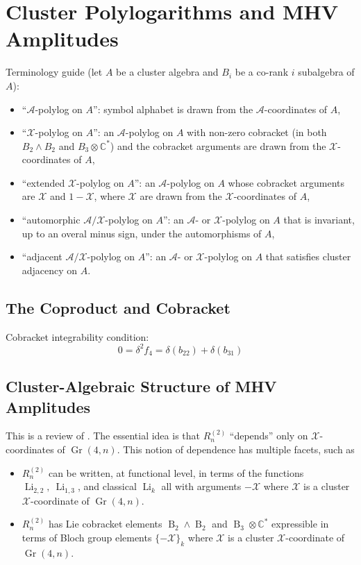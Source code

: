 \documentclass[11pt]{article}
\DeclareMathOperator{\B}{B}
\DeclareMathOperator{\Gr}{Gr}
\DeclareMathOperator{\Li}{Li}
\def\x{\mathcal{X}}
\def\xcoord{$\mathcal{X}$-coordinate }
\def\xcoords{$\mathcal{X}$-coordinates }
\def\a{\mathcal{A}}
\def\acoords{$\mathcal{A}$-coordinates }
\def\bb2{B_2\wedge B_2}
\def\b3c{B_3 \otimes \mathbb{C}^*}
\begin{document}
\section{Cluster Polylogarithms and MHV Amplitudes} \label{sec:cluster_polylog_MHV_review}

Terminology guide (let $A$ be a cluster algebra and $B_i$ be a co-rank $i$ subalgebra of $A$):
\begin{itemize}
	\item ``$\a$-polylog on $A$'': symbol alphabet is drawn from the \acoords of $A$,
	\item ``$\x$-polylog on $A$'': an $\a$-polylog on $A$ with non-zero cobracket (in both $\bb2$ and $\b3c$) and the cobracket arguments are drawn from the \xcoords of $A$,
	\item ``extended $\x$-polylog on $A$'': an $\a$-polylog on $A$ whose cobracket arguments are $\x$ and $1-\x$, where $\x$ are drawn from the \xcoords of $A$,
	\item ``automorphic $\a/\x$-polylog on $A$'': an $\a$- or $\x$-polylog on $A$ that is invariant, up to an overal minus sign, under the automorphisms of $A$,
	\item ``adjacent $\a/\x$-polylog on $A$'': an $\a$- or $\x$-polylog on $A$ that satisfies cluster adjacency on $A$.
\end{itemize}

\subsection{The Coproduct and Cobracket}

Cobracket integrability condition:
\begin{equation} \label{eq:integrability}
	0 = \delta^2 f_4 = \delta(b_{22}) + \delta(b_{31})
\end{equation}


\subsection{Cluster-Algebraic Structure of MHV Amplitudes}\label{sec:cluster-algebra-R2n}

This is a review of \cite{Golden:2013xva,Golden:2014xqa,Golden:2014pua}. The essential idea is that $R^{(2)}_n$ ``depends'' only on \xcoords of $\Gr(4,n)$. This notion of dependence has multiple facets, such as 
\begin{itemize}
	\item $R^{(2)}_n$ can be written, at functional level, in terms of the functions $\Li_{2,2},~\Li_{1,3}$, and classical $\Li_k$ all with arguments $-\mathcal{X}$ where $\mathcal{X}$ is a cluster \xcoord of $\Gr(4,n)$.
	\item $R^{(2)}_n$ has Lie cobracket elements $\B_2 \wedge \B_2$ and $\B_3 \otimes \mathbb{C}^*$ expressible in terms of Bloch group elements $\{-\mathcal{X}\}_k$ where $\mathcal{X}$ is a cluster \xcoord of $\Gr(4,n)$. 
\end{itemize}
\end{document}
